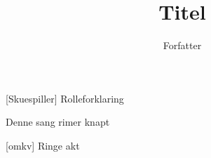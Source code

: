 \documentclass[a4paper,11pt]{article}
\title{Titel}
\author{Forfatter}
\begin{document}
\maketitle

\begin{roles}
[Skuespiller] Rolleforklaring
\end{roles}

\begin{song}
   Denne sang rimer knapt

  [omkv] Ringe akt

\end{song}
\end{document}
